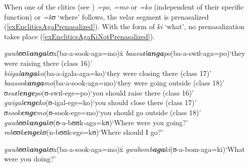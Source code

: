 When one of the clitics (see ) \textit{=po}, \textit{=mo} or \textit{=ko} (independent of their specific function) or \textit{=kʊ} \lq where' follows, the velar segment is prenasalized (\ref{exEncliticsAgaPrenasalized}). With the  form of \textit{ki} `what', no prenasalization takes place (\ref{exEncliticsAgaKiNotPrenasalized}).
\begin{exe}
\ex\label{exEncliticsAgaPrenasalized}
\begin{tabbing}
\textit{gwabʊʊk\textbf{anga}kʊ}x\=(\degree ba-a-sook-aga=mo)x\=\kill
\textit{baaswɪl\textbf{anga}po}\>(\degree ba-a-swɪl-aga=po)\>`they were raising there (class 16)'\\
\textit{biigal\textbf{anga}ko}\>(\degree ba-a-igala-aga=ko)\>`they were closing there (class 17)'\\
\textit{baasook\textbf{anga}mo}\>(\degree ba-a-sook-aga=mo)\>`they were going outside (class 18)'\\
\textit{ʊswɪl\textbf{enge}po}\>(\degree ʊ-swɪl-ege=po)\>`you should raise there (class 16)'\\
\textit{gwigal\textbf{enge}ko}\>(\degree ʊ-igal-ege=ko)\>`you should close there (class 17)'\\
\textit{ʊsook\textbf{enge}mo}\>(\degree ʊ-sook-ege=mo)\>`you should go outside (class 18)'\\
\textit{gwabʊʊk\textbf{anga}kʊ}\>(\degree ʊ-a-bʊʊk-aga=kʊ)\>`Where were you going?'\\
\textit{mbʊʊk\textbf{enge}kʊ}\>(\degree n-bʊʊk-ege=kʊ)\>`Where should I go?'
\end{tabbing}
\ex\label{exEncliticsAgaKiNotPrenasalized}\begin{tabbing}
\textit{gwabʊʊk\textbf{anga}kʊ}x\=(\degree ba-a-sook-aga=mo)x\=\kill
\textit{gwabomb\textbf{aga}ki}\>(\degree ʊ-a-bom-aga=ki)\>`What were you doing?'
\end{tabbing}
\end{exe}
